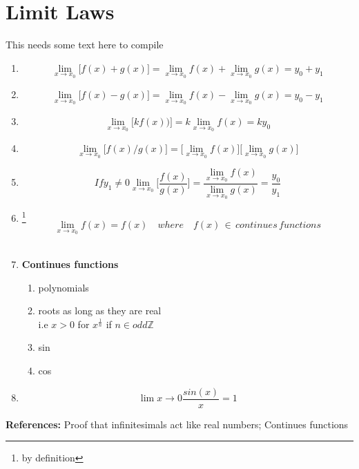 \documentclass[12pt, a4paper,oneside]{book}
\begin{document}
	\section{Limit Laws}
 		This needs some text here to compile
        \begin{enumerate}
 			\item {\[\lim_{x\to x_0} \big[ f(x)+g(x) \big] = \lim_{x\to x_0} f(x) + 						 \lim_{x\to x_0} g(x) =y_0+y_1\]}
           \item {\[\lim_{x\to x_0} \big[ f(x)-g(x) \big] = \lim_{x\to x_0} f(x) - 							 \lim_{x\to x_0} g(x) =y_0-y_1\]}
          \item {\[\lim_{x\to x_0} \big[ kf(x)) \big] =k\lim_{x\to x_0} f(x)=ky_0\]}
         \item{ \[\lim_{x\to x_0} \big[f(x)/g(x) \big]= \big[\lim_{x\to x_0} f(x)\big] 					\big[\lim_{x\to x_0} g(x)\big]\]}
          \item{ \[ If y_1  \neq{0} \lim_{x\to x_0} \big [\frac{f(x)}{g(x)} \big]=  						\frac{\lim_{x\to x_0} f(x)}{ \lim_{x\to x_0} g(x)}= \frac{y_0}{y_1}\]}
         	 
          \item \footnote{by definition}{\[\lim_{x\to x_0} f(x) =f(x) \quad where \quad 					f(x) \, \in \, continues \, functions\]\\}
   \item{		\textbf{Continues functions}
       
        \begin{enumerate}
      		\item{polynomials}
     		 \item{roots as long as they are real \\ i.e \(x > 0\) for 
          			\({x}^{\frac{1}{n}}\) if \( n \in odd \mathbb{Z} \)}
        \item{sin}
         \item{cos}
           
         
                   \end{enumerate}
           }
    	 \item{\[\lim{x \to 0} \frac{sin(x)}{x}=1\]}

		\end{enumerate}
    \textbf{References:} Proof that infinitesimals act like real numbers; Continues functions 
\end{document}
